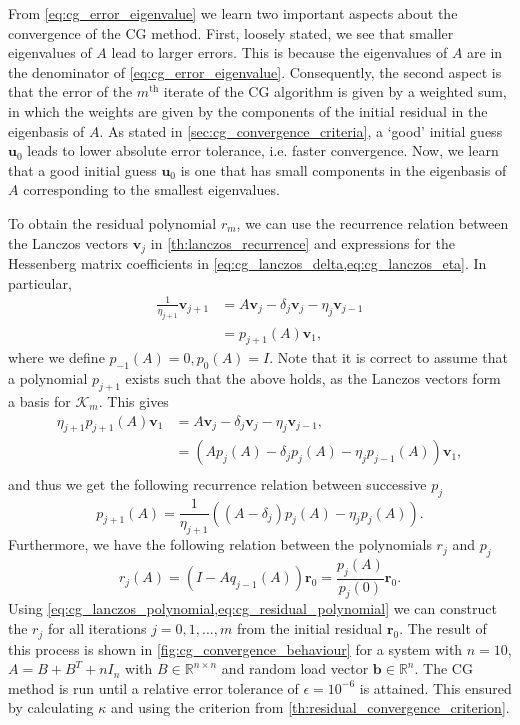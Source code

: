 From \cref{eq:cg_error_eigenvalue} we learn two important aspects about the convergence of the CG method. First, loosely stated, we see that smaller eigenvalues of $A$ lead to larger errors. This is because the eigenvalues of $A$ are in the denominator of \cref{eq:cg_error_eigenvalue}. Consequently, the second aspect is that the error of the $m^{\text{th}}$ iterate of the CG algorithm is given by a weighted sum, in which the weights are given by the components of the initial residual in the eigenbasis of $A$. As stated in \cref{sec:cg_convergence_criteria}, a `good' initial guess $\mathbf{u}_0$ leads to lower absolute error tolerance, i.e. faster convergence. Now, we learn that a good initial guess $\mathbf{u}_0$ is one that has small components in the eigenbasis of $A$ corresponding to the smallest eigenvalues. 

To obtain the residual polynomial $r_m$, we can use the recurrence relation between the Lanczos vectors $\mathbf{v}_j$ in \cref{th:lanczos_recurrence} and expressions for the Hessenberg matrix coefficients in \cref{eq:cg_lanczos_delta,eq:cg_lanczos_eta}. In particular,
\begin{align*}
  \frac{1}{\eta_{j+1}} \mathbf{v}_{j+1} & = A \mathbf{v}_j - \delta_j \mathbf{v}_j - \eta_j \mathbf{v}_{j-1} \\
                                        & = p_{j+1}(A) \mathbf{v}_1,
\end{align*}
where we define $p_{-1}(A) = 0, p_0(A) = I$. Note that it is correct to assume that a polynomial $p_{j+1}$ exists such that the above holds, as the Lanczos vectors form a basis for $\mathcal{K}_m$. This gives
\begin{align*}
  \eta_{j+1}p_{j+1}(A)\mathbf{v}_1 & = A \mathbf{v}_j - \delta_j \mathbf{v}_j - \eta_j \mathbf{v}_{j-1},          \\
                                   & = \left( A p_j(A) - \delta_j p_j(A) - \eta_j p_{j-1}(A) \right)\mathbf{v}_1, \\
\end{align*}
and thus we get the following recurrence relation between successive $p_j$
\begin{equation}
  p_{j+1}(A) = \frac{1}{\eta_{j+1}}\left( (A - \delta_j )p_j(A) - \eta_j p_{j}(A) \right).
  \label{eq:cg_lanczos_polynomial}
\end{equation}
Furthermore, we have the following relation between the polynomials $r_j$ and $p_j$ \cite[Section 3.2]{Meurant_Strakoš_2006}
\begin{equation}
  r_{j}(A) = (I-Aq_{j-1}(A))\mathbf{r}_0 = \frac{p_{j}(A)}{p_{j}(0)}\mathbf{r}_0.
  \label{eq:cg_residual_polynomial}
\end{equation}
Using \cref{eq:cg_lanczos_polynomial,eq:cg_residual_polynomial} we can construct the $r_j$ for all iterations $j=0,1,\dots,m$ from the initial residual $\mathbf{r}_0$. The result of this process is shown in \cref{fig:cg_convergence_behaviour} for a system with $n=10$, $A = B + B^T + nI_n$ with $B\in\mathbb{R}^{n \times n}$ and random load vector $\mathbf{b}\in\mathbb{R}^n$. The CG method is run until a relative error tolerance of $\epsilon = 10^{-6}$ is attained. This ensured by calculating $\kappa$ and using the criterion from \cref{th:residual_convergence_criterion}. 

